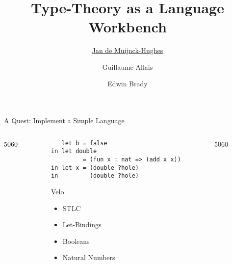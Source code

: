 \documentclass[pdftex,british,final,infofoot, aspectratio=169]{slidedeck}
\title{Type-Theory as a Language Workbench}
\author[Jan de Muijnck-Hughes \and Guillaume Allais \and Edwin Brady]{\underline{Jan de Muijnck-Hughes} \and Guillaume Allais \and Edwin Brady}
\date[EVCS '23]{\origdate\printdate{2023-04-05}}
\makeatletter
\newcommand\HUGE{\@setfontsize\Huge{50}{60}}
\makeatother
\begin{document}
\maketitle

\begin{frame}[fragile]{A Quest: Implement a Simple Language}
  \begin{columns}
    \begin{column}{0.2\textwidth}
      \centering
      \HUGE\faUserTie
      \\
      \Huge{}
    \end{column}
    \begin{column}{0.5\textwidth}
\begin{Verbatim}
   let b = false
in let double
         = (fun x : nat => (add x x))
in let x = (double ?hole)
in         (double ?hole)
\end{Verbatim}

        \begin{block}{Velo}
          \begin{multicols}{2}
            \begin{itemize}
            \item STLC
            \item Let-Bindings
            \item Booleans
            \item Natural Numbers
            \end{itemize}
          \end{multicols}
        \end{block}

    \end{column}
    \begin{column}{0.2\textwidth}
      \centering
      \HUGE\faUserNinja
      \\
      \Huge{}
    \end{column}
  \end{columns}

\end{frame}
\end{document}

